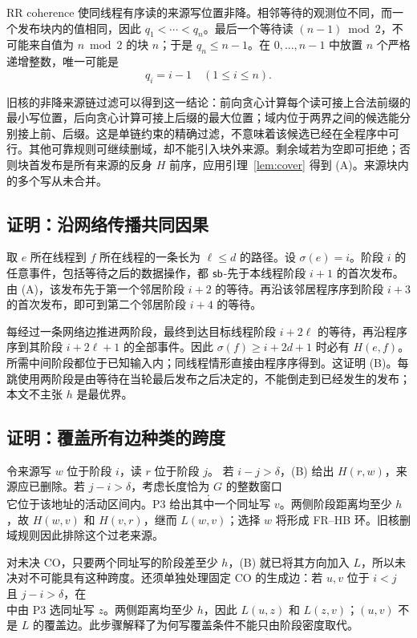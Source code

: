 RR coherence 使同线程有序读的来源写位置非降。相邻等待的观测位不同，而一个发布块内的值相同，因此 $q_1<\cdots<q_n$。最后一个等待读 $(n-1)\bmod2$，不可能来自值为 $n\bmod2$ 的块 $n$；于是 $q_n\le n-1$。在 $0,\ldots,n-1$ 中放置 $n$ 个严格递增整数，唯一可能是
\begin{equation}
 q_i=i-1\quad(1\le i\le n).\label{eq:block}
\end{equation}

旧核的非降来源链过滤可以得到这一结论：前向贪心计算每个读可接上合法前缀的最小写位置，后向贪心计算可接上后缀的最大位置；域内位于两界之间的候选能分别接上前、后缀。这是单链约束的精确过滤，不意味着该候选已经在全程序中可行。其他可靠规则可继续删域，却不能引入块外来源。剩余域若为空即可拒绝；否则块首发布是所有来源的反身 $H$ 前序，应用引理~\ref{lem:cover} 得到 (A)。来源块内的多个写从未合并。

\subsection{证明：沿网络传播共同因果}
取 $e$ 所在线程到 $f$ 所在线程的一条长为 $\ell\le d$ 的路径。设 $\sigma(e)=i$。阶段 $i$ 的任意事件，包括等待之后的数据操作，都 $\mathsf{sb}$-先于本线程阶段 $i+1$ 的首次发布。由 (A)，该发布先于第一个邻居阶段 $i+2$ 的等待。再沿该邻居程序序到阶段 $i+3$ 的首次发布，即可到第二个邻居阶段 $i+4$ 的等待。

每经过一条网络边推进两阶段，最终到达目标线程阶段 $i+2\ell$ 的等待，再沿程序序到其阶段 $i+2\ell+1$ 的全部事件。因此 $\sigma(f)\ge i+2d+1$ 时必有 $H(e,f)$。所需中间阶段都位于已知输入内；同线程情形直接由程序序得到。这证明 (B)。每跳使用两阶段是由等待在当轮最后发布之后决定的，不能倒走到已经发生的发布；本文不主张 $h$ 是最优界。

\subsection{证明：覆盖所有边种类的跨度}
令来源写 $w$ 位于阶段 $i$，读 $r$ 位于阶段 $j$。
若 $i-j>\delta$，(B) 给出 $H(r,w)$，来源应已删除。若 $j-i>\delta$，考虑长度恰为 $G$ 的整数窗口
\begin{equation}
 [j-h-G+1,\ j-h].\label{eq:pastwindow}
\end{equation}
它位于该地址的活动区间内。P3 给出其中一个同址写 $v$。两侧阶段距离均至少 $h$，故 $H(w,v)$ 和 $H(v,r)$，继而 $L(w,v)$；选择 $w$ 将形成 FR--HB 环。旧核删域规则因此排除这个过老来源。

对未决 CO，只要两个同址写的阶段差至少 $h$，(B) 就已将其方向加入 $L$，所以未决对不可能具有这种跨度。还须单独处理固定 CO 的生成边：若 $u,v$ 位于 $i<j$ 且 $j-i>\delta$，在
\begin{equation}
 [i+h,\ i+h+G-1]\label{eq:coverwindow}
\end{equation}
中由 P3 选同址写 $z$。两侧距离均至少 $h$，因此 $L(u,z)$ 和 $L(z,v)$；$(u,v)$ 不是 $L$ 的覆盖边。此步骤解释了为何写覆盖条件不能只由阶段密度取代。

